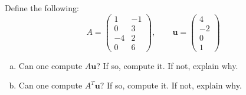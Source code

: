 \documentclass[11pt,letterpaper]{article}
\begin{document}
\newpage



 Define the following:
	\[
	A= \begin{pmatrix} 1 & -1 \\ 0 & 3 \\ -4 & 2 \\ 0 & 6 \end{pmatrix}, \qquad
	\mathbf{u}= \begin{pmatrix} 4 \\ -2 \\ 0 \\ 1 \end{pmatrix}
	\]

\begin{enumerate}[(a)]
\item Can one compute $A\mathbf{u}$? If so, compute it. If not, explain why. 
\item Can one compute $A^T\mathbf{u}$? If so, compute it. If not, explain why. 
\end{enumerate}
\end{document}

